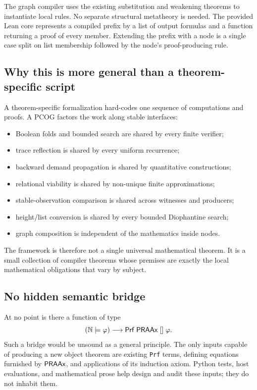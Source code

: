 The graph compiler uses the existing substitution and weakening theorems to
instantiate local rules.  No separate structural metatheory is needed.  The
provided Lean core represents a compiled prefix by a list of output formulas
and a function returning a proof of every member.  Extending the prefix with a
node is a single case split on list membership followed by the node's
proof-producing rule.

\subsection{Why this is more general than a theorem-specific script}

A theorem-specific formalization hard-codes one sequence of computations and
proofs.  A PCOG factors the work along stable interfaces:

\begin{itemize}
\item Boolean folds and bounded search are shared by every finite verifier;
\item trace reflection is shared by every uniform recurrence;
\item backward demand propagation is shared by quantitative constructions;
\item relational viability is shared by non-unique finite approximations;
\item stable-observation comparison is shared across witnesses and producers;
\item height/list conversion is shared by every bounded Diophantine search;
\item graph composition is independent of the mathematics inside nodes.
\end{itemize}

The framework is therefore not a single universal mathematical theorem.  It
is a small collection of compiler theorems whose premises are exactly the
local mathematical obligations that vary by subject.

\subsection{No hidden semantic bridge}

At no point is there a function of type
\[
  (\mathbb{N}\models\varphi)\longrightarrow \mathsf{Prf}\;\mathsf{PRAAx}\;[]\;\varphi.
\]
Such a bridge would be unsound as a general principle.  The only inputs capable
of producing a new object theorem are existing \texttt{Prf} terms, defining
equations furnished by \(\mathsf{PRAAx}\), and applications of its induction axiom.
Python tests, host evaluations, and mathematical prose help design and audit
these inputs; they do not inhabit them.
